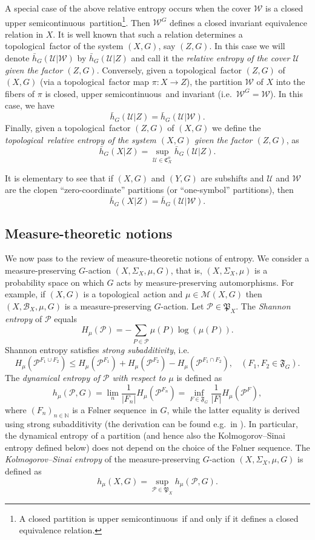 \documentclass[12pt]{amsart}
\theoremstyle{definition}
\numberwithin{equation}{section}
\newcommand{\CU}{\mathcal{U}}
\newcommand{\CW}{\mathcal{W}}
\newcommand{\GP}{\mathfrak{P}}
\newcommand{\GF}{\mathfrak{F}}
\def \N {\mathbb N}
\def \P {\mathcal P}
\def \M {\mathcal M}
\def \sq {sequence}
\def \tl {topological}
\def \usc {upper semicontinuous}
\def \N {\mathbb N}
\def \CU {\mathcal U}
\def \P {\mathcal P}
\def \M {\mathcal M}
\def \sq {sequence}
\def \tl {topological}
\def \usc {upper semicontinuous}
\begin{document}
A special case of the above relative entropy occurs when the cover $\CW$ is a closed \usc\ partition\footnote{A closed partition is \usc\ if and only if it defines a closed equivalence relation.}. Then $\CW^G$ defines a closed invariant equivalence relation in $X$. It is well known that such a relation determines a \tl\ factor of the system $(X,G)$, say $(Z,G)$. In this case we will denote $\bar h_G(\CU|\CW)$ by $\bar h_G(\CU|Z)$ and call it the \emph{relative entropy of the cover $\CU$ given the factor $(Z,G)$}. Conversely, given a \tl\ factor $(Z,G)$ of $(X,G)$ (via a \tl\ factor map $\pi:X\to Z$), the partition $\CW$ of $X$ into the fibers of $\pi$ is closed, \usc\ and invariant (i.e.\ $\CW^G=\CW$). In this case, we have
$$
\bar h_G(\CU|Z)=\bar h_G(\CU|\CW).
$$
Finally, given a \tl\ factor $(Z,G)$ of $(X,G)$ we define the \emph{\tl\ relative entropy of the system $(X,G)$ given the factor $(Z,G)$}, as
$$
\bar h_G(X|Z)=\sup_{\CU\in\mathfrak C^o_X} \bar h_G(\CU|Z).
$$

It is elementary to see that if $(X,G)$ and $(Y,G)$ are subshifts and $\CU$ and $\CW$ are the clopen ``zero-coordinate'' partitions (or ``one-symbol'' partitions), then 
$$
\bar h_G(X|Z)=\bar h_G(\CU|\CW).
$$

\subsection{Measure-theoretic notions}
We now pass to the review of measure-theoretic notions of entropy. We consider a measure-preserving $G$-action $(X,\Sigma_X,\mu,G)$, that is, $(X,\Sigma_X,\mu)$ is a probability space on which $G$ acts by measure-preserving automorphisms. For example, if $(X,G)$ is a \tl\ action and $\mu\in\M(X,G)$ then $(X,\mathcal B_X,\mu,G)$ is a measure-preserving $G$-action. Let $\P\in \GP_X$. The \emph{Shannon entropy} of $\P$ equals
$$
H_\mu(\P)=-\sum_{P\in\P}\mu(P)\log(\mu(P)).
$$
Shannon entropy satisfies \emph{strong subadditivity}, i.e.\
$$
H_\mu(\P^{F_1\cup F_2})\le H_\mu(\P^{F_1})+H_\mu(\P^{F_2})-H_\mu(\P^{F_1\cap F_2}),\ \ \ \ (F_1, F_2\in \mathfrak{F}_G).
$$
The \emph{dynamical entropy of $\P$ with respect to $\mu$} is defined as 
$$
h_\mu(\P,G) = \lim_n \frac1{|F_n|}H_\mu(\P^{F_n})= \inf_{F\in\GF_G} \frac1{|F|}H_\mu(\P^F),
$$
where $(F_n)_{n\in\N}$ is a F\o lner \sq\ in $G$, while the latter equality is derived using strong subadditivity (the derivation can be found e.g.\ in \cite{DFR}). In particular, the dynamical entropy of a partition (and hence also the Kolmogorov--Sinai entropy defined below) does not depend on the choice of the F\o lner \sq.
The \emph{Kolmogorov--Sinai entropy} of the measure-preserving $G$-action $(X,\Sigma_X,\mu,G)$ is defined as
$$
h_\mu(X,G)=\sup_{\P\in\GP_X} h_\mu(\P,G).
$$
\end{document}
